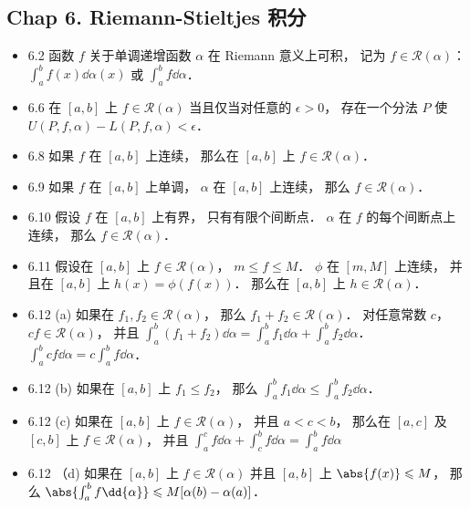 \subsection{Chap 6. Riemann-Stieltjes 积分}
\begin{itemize}
\item 6.2 函数 $f$ 关于单调递增函数 $\alpha$ 在 Riemann 意义上可积， 记为 $f\in \mathscr{R}(\alpha)$： $\int_a^b f(x) \dd\alpha(x)$ 或 $\int_a^b f\dd{\alpha}$．

\item 6.6 在 $[a,b]$ 上 $f\in\mathscr{R}(\alpha)$ 当且仅当对任意的 $\epsilon>0$， 存在一个分法 $P$ 使 $U(P,f,\alpha)-L(P,f,\alpha)<\epsilon$．

\item 6.8 如果 $f$ 在 $[a,b]$ 上连续， 那么在 $[a,b]$ 上 $f\in \mathscr{R}(\alpha)$．

\item 6.9 如果 $f$ 在 $[a,b]$ 上单调， $\alpha$ 在 $[a,b]$ 上连续， 那么 $f\in \mathscr{R}(\alpha)$．

\item 6.10 假设 $f$ 在 $[a,b]$ 上有界， 只有有限个间断点． $\alpha$ 在 $f$ 的每个间断点上连续， 那么 $f\in \mathscr{R}(\alpha)$．

\item 6.11 假设在 $[a,b]$ 上 $f\in \mathscr{R}(\alpha)$， $m\leqslant f\leqslant M$． $\phi$ 在 $[m, M]$ 上连续， 并且在 $[a,b]$ 上 $h(x) = \phi(f(x))$． 那么在 $[a,b]$ 上 $h\in \mathscr{R}(\alpha)$．

\item 6.12 (a) 如果在 $f_1,f_2 \in \mathscr{R}(\alpha)$， 那么 $f_1+f_2 \in \mathscr{R}(\alpha)$． 对任意常数 $c$， $cf\in \mathscr{R}(\alpha)$， 并且 $\int_a^b (f_1+f_2)\dd{\alpha} = \int_a^bf_1\dd{\alpha} + \int_a^bf_2\dd{\alpha}$． $\int_a^b cf\dd{\alpha} = c\int_a^b f\dd{\alpha}$．

\item  6.12 (b) 如果在 $[a,b]$ 上 $f_1\leqslant f_2$， 那么 $\int_a^bf_1\dd{\alpha} \leqslant \int_a^bf_2\dd{\alpha}$．

\item  6.12 (c) 如果在 $[a,b]$ 上 $f\in \mathscr{R}(\alpha)$， 并且 $a<c< b$， 那么在 $[a,c]$ 及 $[c,b]$ 上 $f\in \mathscr{R}(\alpha)$， 并且 $\int_a^cf\dd{\alpha}+\int_c^bf\dd{\alpha} = \int_a^bf\dd{\alpha}$

\item 6.12 （d) 如果在 $[a,b]$ 上 $f\in \mathscr{R}(\alpha)$ 并且 $[a,b]$ 上 $\abs{f(x)}\leqslant M$， 那么 $\abs{\int_a^bf\dd{\alpha}} \leqslant M[\alpha(b)-\alpha(a)]$．


\end{itemize}

